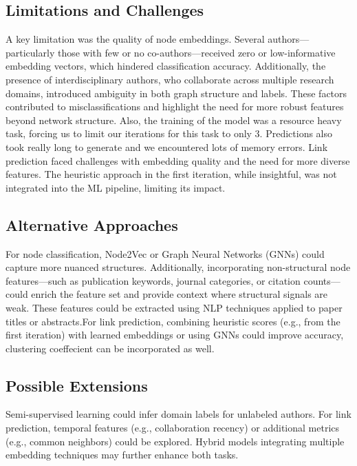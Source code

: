 \documentclass[conference, 12pt]{IEEEtran}
\begin{document}
\subsection{Limitations and Challenges}
A key limitation was the quality of node embeddings. Several authors—particularly those with few or no co-authors—received zero or low-informative embedding vectors, which hindered classification accuracy. Additionally, the presence of interdisciplinary authors, who collaborate across multiple research domains, introduced ambiguity in both graph structure and labels. These factors contributed to misclassifications and highlight the need for more robust features beyond network structure.
Also, the training of the model was a resource heavy task, forcing us to limit our iterations for this task to only 3. Predictions also took really long to generate and we encountered lots of memory errors. Link prediction faced challenges with embedding quality and the need for more diverse features. The heuristic approach in the first iteration, while insightful, was not integrated into the ML pipeline, limiting its impact.

\subsection{Alternative Approaches}
For node classification, Node2Vec or Graph Neural Networks (GNNs) could capture more nuanced structures. Additionally, incorporating non-structural node features—such as publication keywords, journal categories, or citation counts—could enrich the feature set and provide context where structural signals are weak. These features could be extracted using NLP techniques applied to paper titles or abstracts.For link prediction, combining heuristic scores (e.g., from the first iteration) with learned embeddings or using GNNs could improve accuracy, clustering coeffecient can be incorporated as well.

\subsection{Possible Extensions}
Semi-supervised learning could infer domain labels for unlabeled authors. For link prediction, temporal features (e.g., collaboration recency) or additional metrics (e.g., common neighbors) could be explored. Hybrid models integrating multiple embedding techniques may further enhance both tasks.



\end{document}
